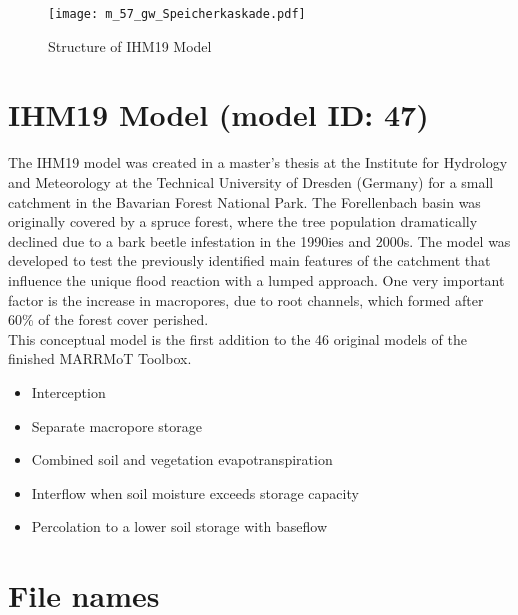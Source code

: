 \documentclass[11pt,color]{tudbook}
\begin{document}
\begin{onehalfspacing}



\begin{figure}[H]
\centering
\texttt{[image: m\_57\_gw\_Speicherkaskade.pdf]}
\caption{Structure of IHM19 Model}
\label{fig:m_57_gw_Speicherkaskade}
\end{figure}

\section{IHM19 Model (model ID: 47)}

The IHM19 model was created in a master's thesis at the Institute for Hydrology and Meteorology at the Technical University of Dresden (Germany) for a small catchment in the Bavarian Forest National Park.
The Forellenbach basin was originally covered by a spruce forest, where the tree population dramatically declined due to a bark beetle infestation in the 1990ies and 2000s.
The model was developed to test the previously identified main features of the catchment that influence the unique flood reaction with a lumped approach.
One very important factor is the increase in macropores, due to root channels, which formed after 60\% of the forest cover perished.\\
This conceptual model is the first addition to the 46 original models of the finished MARRMoT Toolbox.

\begin{itemize}
\item Interception
\item Separate macropore storage
\item Combined soil and vegetation evapotranspiration
\item Interflow when soil moisture exceeds storage capacity
\item Percolation to a lower soil storage with baseflow
\end{itemize}

\section{File names}


\end{onehalfspacing}
\end{document}
